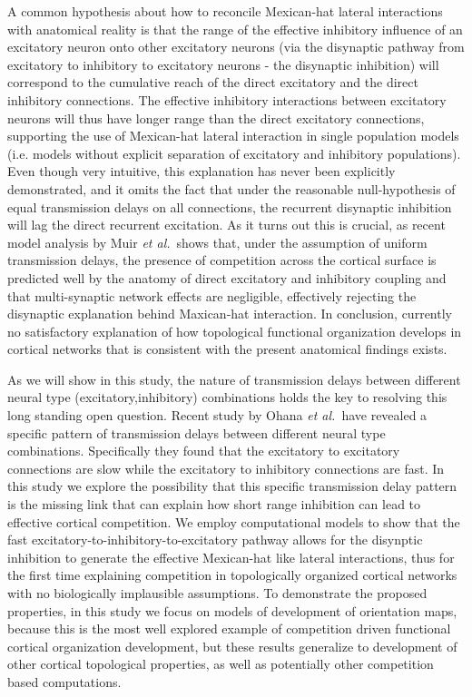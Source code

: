 \documentclass[utf8]{frontiersSCNS}
\newcommand{\etal}{\textit{et al.}}
\begin{document}
A common hypothesis about how to reconcile Mexican-hat lateral interactions with anatomical reality is that the range of the effective inhibitory influence of an excitatory neuron onto other excitatory neurons (via the disynaptic pathway from excitatory to inhibitory to excitatory neurons - the disynaptic inhibition) will correspond to the cumulative reach of the direct excitatory and the direct inhibitory connections. The effective
inhibitory interactions between excitatory neurons will thus have longer range than the direct excitatory connections, supporting the use
of Mexican-hat lateral interaction in single population models (i.e. models without explicit separation of excitatory and
inhibitory populations). Even though very intuitive, this explanation has never been explicitly demonstrated, and  
it omits the fact that under the reasonable null-hypothesis of equal transmission delays on all connections, 
the recurrent disynaptic inhibition will lag the direct recurrent excitation. As it turns out this is crucial, 
as recent model analysis by Muir \etal\,\citep{Muir2014} shows that, under the assumption of uniform transmission delays, the presence of competition across the cortical surface is predicted well by the anatomy of direct excitatory and inhibitory coupling and that multi-synaptic network effects are negligible, effectively rejecting the disynaptic explanation behind Maxican-hat interaction. In conclusion, currently no satisfactory explanation of how topological functional organization develops in cortical networks that is consistent with the present anatomical findings exists. 

As we will show in this study, the nature of transmission delays between different neural type (excitatory,inhibitory) combinations
holds the key to resolving this long standing open question. Recent study by Ohana \etal\,\citep{Ohana2012} have revealed a specific pattern of transmission delays between different neural type combinations. Specifically they found that the excitatory to excitatory connections are slow while the excitatory to inhibitory connections are fast. In this study we explore the 
possibility that this specific transmission delay pattern is the missing link that can explain how short range inhibition can lead 
to effective cortical competition. We employ computational models to show that the fast excitatory-to-inhibitory-to-excitatory pathway allows for the disynptic inhibition to generate the effective Mexican-hat like lateral interactions, thus for the first time 
explaining competition in topologically organized cortical networks with no biologically implausible assumptions. To demonstrate the
proposed properties, in this study we focus on models of development of orientation maps, because this is the most well explored
example of competition driven functional cortical organization development, but these results generalize to development of other
cortical topological properties, as well as potentially other competition based computations.
\end{document}
